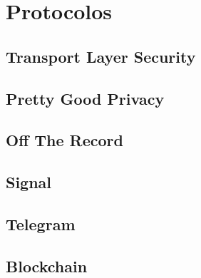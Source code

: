 \chapter{Protocolos}
\label{cha:protocolos}

\section{Transport Layer Security}
\label{sec:tls}

\section{Pretty Good Privacy}
\label{sec:pgp}

\section{Off The Record}
\label{sec:otr}

\section{Signal}
\label{sec:signal}

\section{Telegram}
\label{sec:telegram}

\section{Blockchain}
\label{sec:blockchain}


